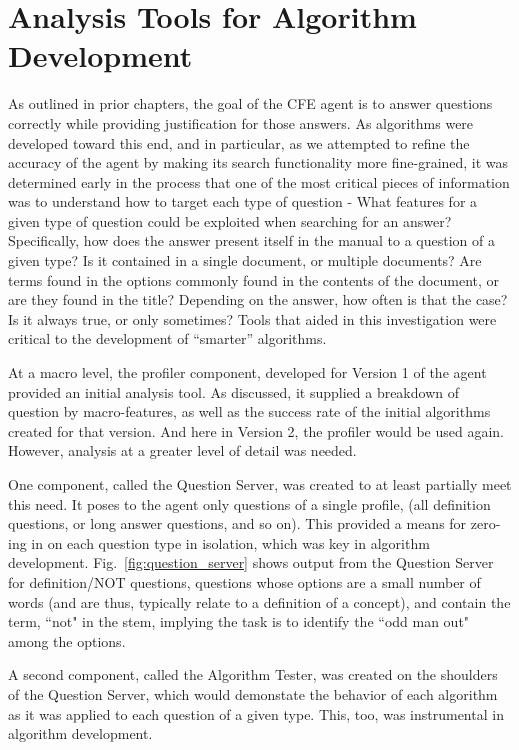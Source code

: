 \section{Analysis Tools for Algorithm Development}

As outlined in prior chapters, the goal of the CFE agent is to answer questions correctly while providing justification for those answers.  As algorithms were developed toward this end, and in particular, as we attempted to refine the accuracy of the agent by making its search functionality more fine-grained, it was determined early in the process that one of the most critical pieces of information was to understand how to target each type of question - What features for a given type of question could be exploited when searching for an answer?  Specifically, how does the answer present itself in the manual to a question of a given type?  Is it contained in a single document, or multiple documents?  Are terms found in the options commonly found in the contents of the document, or are they found in the title?  Depending on the answer, how often is that the case?  Is it always true, or only sometimes?  Tools that aided in this investigation were critical to the development of ``smarter'' algorithms.  

At a macro level, the profiler component, developed for Version 1 of the agent provided an initial analysis tool.  As discussed, it supplied a breakdown of question by macro-features, as well as the success rate of the initial algorithms created for that version.  And here in Version 2, the profiler would be used again.  However, analysis at a greater level of detail was needed.

One component, called the Question Server, was created to at least partially meet this need.  It poses to the agent only questions of a single profile, (all definition questions, or long answer questions, and so on).  This provided a means for zero-ing in on each question type in isolation, which was key in algorithm development.  Fig.~\ref{fig:question_server} shows output from the Question Server for definition/NOT questions, questions whose options are a small number of words (and are thus, typically relate to a definition of a concept), and contain the term, ``not" in the stem, implying the task is to identify the ``odd man out" among the options.

A second component, called the Algorithm Tester, was created on the shoulders of the Question Server, which would demonstate the behavior of each algorithm as it was applied to each question of a given type.  This, too, was instrumental in algorithm development.

